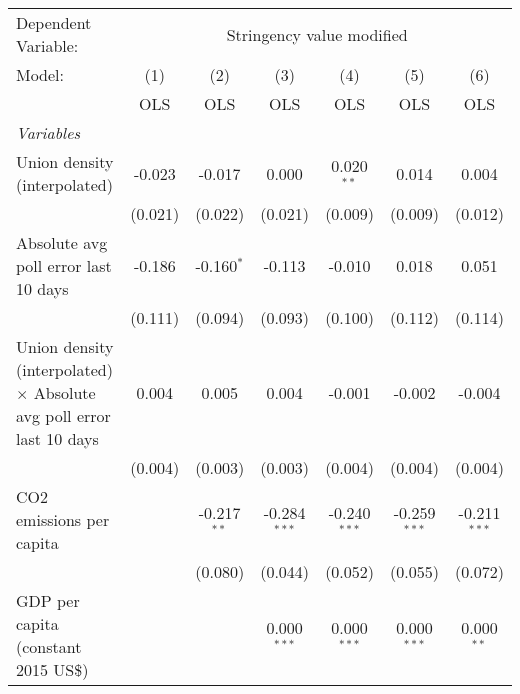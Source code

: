 
\begingroup
\centering
\begin{tabular}{lcccccc}
   \toprule
   Dependent Variable: & \multicolumn{6}{c}{Stringency value modified}\\
   Model:                                                                      & (1)     & (2)           & (3)            & (4)            & (5)            & (6)\\  
                                                                               &  OLS    & OLS           & OLS            & OLS            & OLS            & OLS\\  
   \midrule
   \emph{Variables}\\
   Union density (interpolated)                                                & -0.023  & -0.017        & 0.000          & 0.020$^{**}$   & 0.014          & 0.004\\   
                                                                               & (0.021) & (0.022)       & (0.021)        & (0.009)        & (0.009)        & (0.012)\\   
   Absolute avg poll error last 10 days                                        & -0.186  & -0.160$^{*}$  & -0.113         & -0.010         & 0.018          & 0.051\\   
                                                                               & (0.111) & (0.094)       & (0.093)        & (0.100)        & (0.112)        & (0.114)\\   
   Union density (interpolated) $\times$ Absolute avg poll error last 10 days  & 0.004   & 0.005         & 0.004          & -0.001         & -0.002         & -0.004\\   
                                                                               & (0.004) & (0.003)       & (0.003)        & (0.004)        & (0.004)        & (0.004)\\   
   CO2 emissions per capita                                                    &         & -0.217$^{**}$ & -0.284$^{***}$ & -0.240$^{***}$ & -0.259$^{***}$ & -0.211$^{***}$\\   
                                                                               &         & (0.080)       & (0.044)        & (0.052)        & (0.055)        & (0.072)\\   
   GDP per capita (constant 2015 US\$)                                         &         &               & 0.000$^{***}$  & 0.000$^{***}$  & 0.000$^{***}$  & 0.000$^{**}$\\   

\end{tabular}
